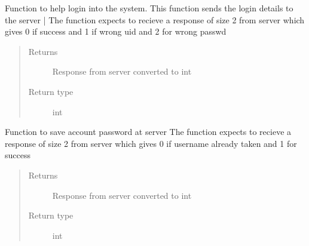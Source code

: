 \documentclass[letterpaper,10pt,english]{sphinxmanual}
\begin{document}
\begin{fulllineitems}
\begin{fulllineitems}
\begin{quote}
\begin{description}
\end{description}\end{quote}

\end{fulllineitems}


\begin{fulllineitems}
\label{\detokenize{Message:Message.Message._login}}
Function to help login into the system. This function sends the login details to the server |
The function expects to recieve a response of size 2 from server which gives 0 if success and 1 if wrong uid and 2 for wrong passwd
\begin{quote}\begin{description}
\item[{Returns}] \leavevmode
Response from server converted to int

\item[{Return type}] \leavevmode
int

\end{description}\end{quote}

\end{fulllineitems}


\begin{fulllineitems}
\label{\detokenize{Message:Message.Message._signuppass}}
Function to save account password at server
The function expects to recieve a response of size 2 from server which gives 0 if username already taken and 1 for success
\begin{quote}\begin{description}
\item[{Returns}] \leavevmode
Response from server converted to int

\item[{Return type}] \leavevmode
int

\end{description}\end{quote}

\end{fulllineitems}



\end{fulllineitems}
\end{document}

